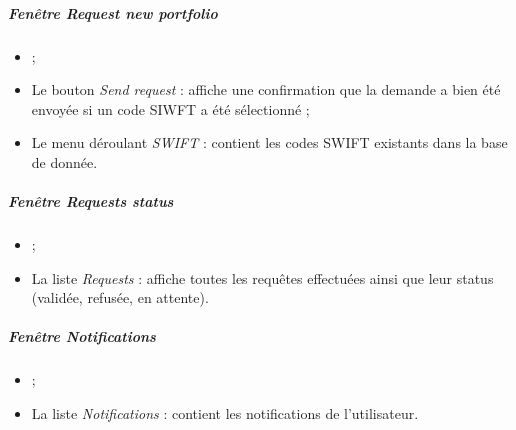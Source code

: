 \subparagraph{Fenêtre \emph{Request new portfolio}}
\begin{itemize}
\item {} ;
\item Le bouton \emph{Send request} : affiche une confirmation que la demande a bien été envoyée si un code SIWFT a été sélectionné ;
\item Le menu déroulant \emph{SWIFT} : contient les codes SWIFT existants dans la base de donnée.
\end{itemize}

\subparagraph{Fenêtre \emph{Requests status}}
\begin{itemize}
\item {} ;
\item La liste \emph{Requests} : affiche toutes les requêtes effectuées ainsi que leur status (validée, refusée, en attente).
\end{itemize}

\subparagraph{Fenêtre \emph{Notifications}}
\begin{itemize}
\item {} ;
\item La liste \emph{Notifications} : contient les notifications de l'utilisateur.
\end{itemize}